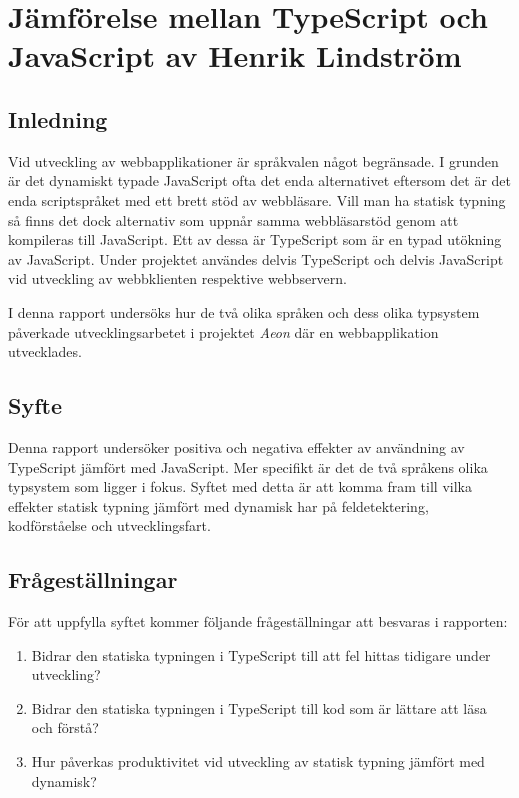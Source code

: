 \chapter{Jämförelse mellan TypeScript och JavaScript av Henrik Lindström}

\section{Inledning}
Vid utveckling av webbapplikationer är språkvalen något begränsade. I grunden är det dynamiskt typade JavaScript ofta det enda alternativet eftersom det är det enda scriptspråket med ett brett stöd av webbläsare. Vill man ha statisk typning så finns det dock alternativ som uppnår samma webbläsarstöd genom att kompileras till JavaScript. Ett av dessa är TypeScript som är en typad utökning av JavaScript. Under projektet användes delvis TypeScript och delvis JavaScript vid utveckling av webbklienten respektive webbservern.

I denna rapport undersöks hur de två olika språken och dess olika typsystem påverkade utvecklingsarbetet i projektet \textit{Aeon} där en webbapplikation utvecklades.
\section{Syfte}
Denna rapport undersöker positiva och negativa effekter av användning av TypeScript jämfört med JavaScript. Mer specifikt är det de två språkens olika typsystem som ligger i fokus. Syftet med detta är att komma fram till vilka effekter statisk typning jämfört med dynamisk har på feldetektering, kodförståelse och utvecklingsfart.

\section{Frågeställningar}
För att uppfylla syftet kommer följande frågeställningar att besvaras i rapporten:
\begin{enumerate}
\item Bidrar den statiska typningen i TypeScript till att fel hittas tidigare under utveckling?
\item Bidrar den statiska typningen i TypeScript till kod som är lättare att läsa och förstå?
\item Hur påverkas produktivitet vid utveckling av statisk typning jämfört med dynamisk?
\end{enumerate}
